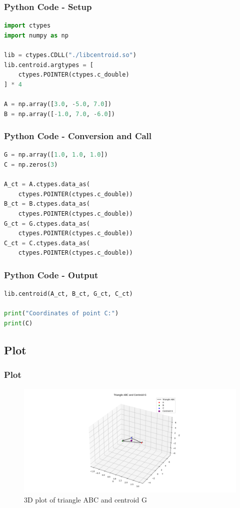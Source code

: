 \documentclass{beamer}
\begin{document}
\begin{frame}[fragile]
\frametitle{Python Code - Setup}

\begin{lstlisting}[language=Python]
import ctypes
import numpy as np

lib = ctypes.CDLL("./libcentroid.so")
lib.centroid.argtypes = [
    ctypes.POINTER(ctypes.c_double)
] * 4

A = np.array([3.0, -5.0, 7.0])
B = np.array([-1.0, 7.0, -6.0])
\end{lstlisting}

\end{frame}


\begin{frame}[fragile]
\frametitle{Python Code - Conversion and Call}

\begin{lstlisting}[language=Python]
G = np.array([1.0, 1.0, 1.0])
C = np.zeros(3)

A_ct = A.ctypes.data_as(
    ctypes.POINTER(ctypes.c_double))
B_ct = B.ctypes.data_as(
    ctypes.POINTER(ctypes.c_double))
G_ct = G.ctypes.data_as(
    ctypes.POINTER(ctypes.c_double))
C_ct = C.ctypes.data_as(
    ctypes.POINTER(ctypes.c_double))
\end{lstlisting}

\end{frame}

\begin{frame}[fragile]
\frametitle{Python Code - Output}

\begin{lstlisting}[language=Python]
lib.centroid(A_ct, B_ct, G_ct, C_ct)

print("Coordinates of point C:")
print(C)
\end{lstlisting}

\end{frame}


















\subsection{Plot}
\begin{frame}
\frametitle{Plot}
\begin{figure}[h!]
   \centering
   \includegraphics[width=01\linewidth]{figs/fig1.png}
   \caption{3D plot of triangle ABC and centroid G}
\end{figure}
\end{frame}
\end{document}
